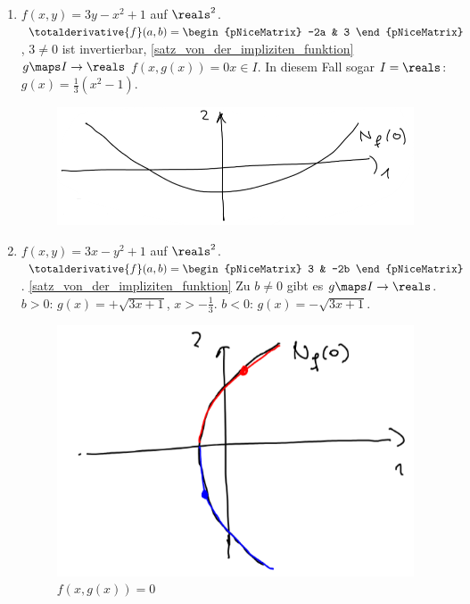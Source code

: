 \begin{beispiele*}
  \begin{enumerate}
    \item \( f(x,y)=3y-x^2+1 \) auf \( \reals^2 \). \( \totalderivative{f}(a,b)=\begin{pNiceMatrix} -2a & 3 \end{pNiceMatrix} \), \( 3\neq 0 \) ist invertierbar, \ref{satz_von_der_impliziten_funktion} \timplies \texists  \( g\maps I\to \reals \) \sd \( f(x,g(x))=0 \)\tforall \( x\in I \). In diesem Fall sogar \( I=\reals \): \( g(x)=\frac{1}{3}(x^2-1) \).
    \begin{figure}[H]
      \centering
      \includegraphics[width=0.5\linewidth]{figures/implizite_funktion_beispiel_kein_eingeschraenkter_definitionsbereich}
      \label{fig:implizite_funktion_beispiel_kein_eingeschraenkter_definitionsbereich}
    \end{figure}
    \item \( f(x,y)=3x-y^2+1 \) auf \( \reals^2 \). \( \totalderivative{f}(a,b)=\begin{pNiceMatrix} 3 & -2b \end{pNiceMatrix} \). \ref{satz_von_der_impliziten_funktion} \timplies Zu \( b\neq 0 \) gibt es \( g\maps I\to \reals \). \( b>0 \): \( g(x)=+\sqrt{3x+1} \), \( x>-\frac{1}{3} \). \( b<0 \): \( g(x)=-\sqrt{3x+1} \).
    \begin{figure}[H]
      \centering
      \includegraphics[width=0.5\linewidth]{figures/implizite_funktion_beispiel_eingeschraenkter_definitionsbereich}
      \caption*{\( f(x,g(x))=0 \)}
      \label{fig:implizite_funktion_beispiel_eingeschraenkter_definitionsbereich}
    \end{figure}
  \end{enumerate}
\end{beispiele*}
